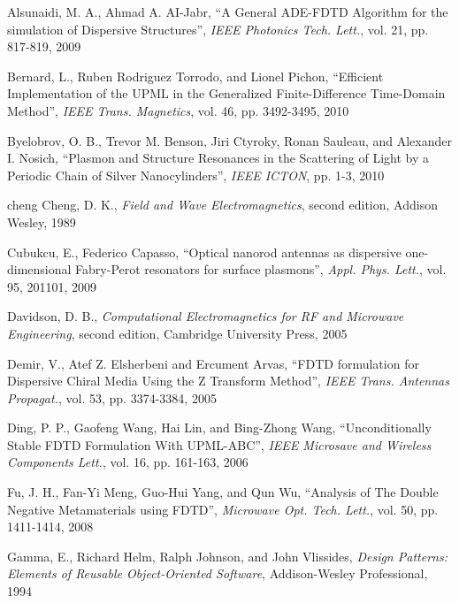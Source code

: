 \cleardoublepage
{}
\begin{thebibliography}{999}

  \bibitem
  {}
  Alsunaidi, M. A., Ahmad A. AI-Jabr,
  ``A General ADE-FDTD Algorithm for the simulation of Dispersive Structures'',
  \textit{IEEE Photonics Tech. Lett.},
  vol. 21,
  pp. 817-819,
  2009

  \bibitem
  {}
  Bernard, L., Ruben Rodriguez Torrodo, and Lionel Pichon,
  ``Efficient Implementation of the UPML in the Generalized Finite-Difference Time-Domain Method'',
  \textit{IEEE Trans. Magnetics},
  vol. 46,
  pp. 3492-3495,
  2010

  \bibitem
  {}
  Byelobrov, O. B., Trevor M. Benson, Jiri Ctyroky, Ronan Sauleau, and Alexander I. Nosich,
  ``Plasmon and Structure Resonances in the Scattering of Light by a Periodic Chain of Silver Nanocylinders'',
  \textit{IEEE ICTON},
  pp. 1-3,
  2010

  \bibitem
  {cheng}
  Cheng, D. K.,
  \textit{Field and Wave Electromagnetics}, second edition,
  Addison Wesley,
  1989

  \bibitem
  {}
  Cubukcu, E., Federico Capasso,
  ``Optical nanorod antennas as dispersive one-dimensional Fabry-Perot resonators for surface plasmons'',
  \textit{Appl. Phys. Lett.},
  vol. 95,
  201101,
  2009

  \bibitem
  {}
  Davidson, D. B.,
  \textit{Computational Electromagnetics for RF and Microwave Engineering}, second edition,
  Cambridge University Press,
  2005

  \bibitem
  {}
  Demir, V., Atef Z. Elsherbeni and Ercument Arvas,
  ``FDTD formulation for Dispersive Chiral Media Using the Z Transform Method'',
  \textit{IEEE Trans. Antennas Propagat.},
  vol. 53,
  pp. 3374-3384,
  2005

  \bibitem
  {}
  Ding, P. P., Gaofeng Wang, Hai Lin, and Bing-Zhong Wang,
  ``Unconditionally Stable FDTD Formulation With UPML-ABC'',
  \textit{IEEE Microsave and Wireless Components Lett.},
  vol. 16,
  pp. 161-163,
  2006

  \bibitem
  {}
  Fu, J. H., Fan-Yi Meng, Guo-Hui Yang, and Qun Wu,
  ``Analysis of The Double Negative Metamaterials using FDTD'',
  \textit{Microwave Opt. Tech. Lett.},
  vol. 50,
  pp. 1411-1414,
  2008

  \bibitem
  {}
  Gamma, E., Richard Helm, Ralph Johnson, and John Vlissides,
  \textit{Design Patterns: Elements of Reusable Object-Oriented Software},
  Addison-Wesley Professional,
  1994


\end{thebibliography}
